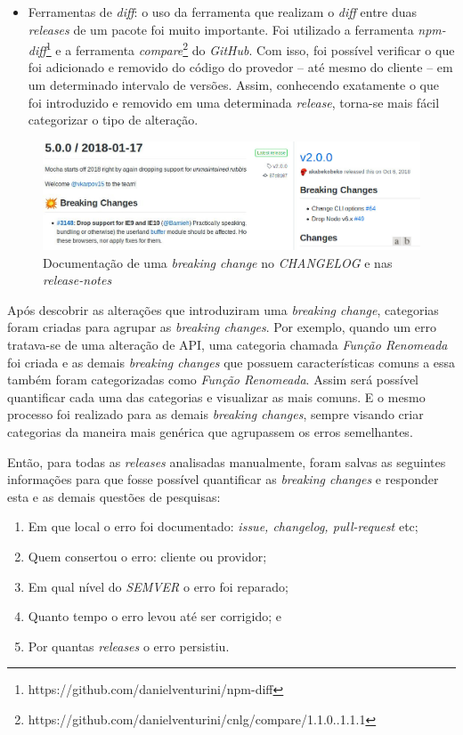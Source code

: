 \begin{itemize}
    \item Ferramentas de \textit{diff}: o uso da ferramenta que realizam o  \textit{diff} entre duas \textit{releases} de um pacote foi muito importante. Foi utilizado a ferramenta \textit{npm-diff}\footnote{https://github.com/danielventurini/npm-diff} e a ferramenta \textit{compare}\footnote{https://github.com/danielventurini/cnlg/compare/1.1.0..1.1.1} do \textit{GitHub}. Com isso, foi possível verificar o que foi adicionado e removido do código do provedor -- até mesmo do cliente -- em um determinado intervalo de versões. Assim, conhecendo exatamente o que foi introduzido e removido em uma determinada \textit{release}, torna-se mais fácil categorizar o tipo de alteração.
\end{itemize}

\begin{figure}
    \centering
    \includegraphics[scale=0.45]{figuras/bc_documentation.jpeg}
    \caption{Documentação de uma \textit{breaking change} no \textit{CHANGELOG} e nas \textit{release-notes}}
    \label{fig:bc_documentation}
\end{figure}{}

Após descobrir as alterações que introduziram uma \textit{breaking change}, categorias foram criadas para agrupar as \textit{breaking changes}. Por exemplo, quando um erro tratava-se de uma alteração de \gls{API}, uma categoria chamada \textit{Função Renomeada} foi criada e as demais \textit{breaking changes} que possuem características comuns a essa também foram categorizadas como \textit{Função Renomeada}. Assim será possível quantificar cada uma das categorias e visualizar as mais comuns. E o mesmo processo foi realizado para as demais \textit{breaking changes}, sempre visando criar categorias da maneira mais genérica que agrupassem os erros semelhantes.

Então, para todas as \textit{releases} analisadas manualmente, foram salvas as seguintes informações para que fosse possível quantificar as \textit{breaking changes} e responder esta e as demais questões de pesquisas:

\begin{enumerate}
    \item Em que local o erro foi documentado: \textit{issue, changelog, pull-request} etc;
    \item Quem consertou o erro: cliente ou providor;
    \item Em qual nível do \textit{SEMVER} o erro foi reparado;
    \item Quanto tempo o erro levou até ser corrigido; e
    \item Por quantas \textit{releases} o erro persistiu.
\end{enumerate}{}


